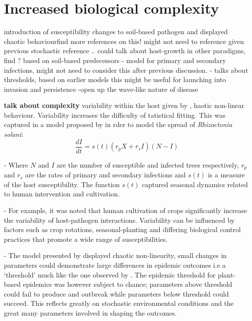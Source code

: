     \section{Increased biological complexity}
    \cite{doi:10.1098/rspb.1996.0116} introduction of susceptibility changes to soil-based pathogen and displayed chaotic behaviour\textemdash find more references on this!
    might not need to reference \cite{doi:10.1098/rspb.1996.0116} given previous stochastic reference \cite{gilligan1985probability}..
    could talk about host-growth in other paradigms, find ? based on soil-based predecessors
    -\cite{doi:10.1098/rstb.1997.0040} model for primary and secondary infections, might not need to consider this after previous discussion.
    -\cite{GUBBINS2000219} talks about thresholds, based on earlier models this might be useful for launching into invasion and persistence 
    -open up the wave-like nature of disease 
    
    \textbf{talk about complexity}
    variability within the host given by \cite{doi:10.1098/rspb.1996.0116}, haotic non-linear behaviour. Variability increases the difficulty of tatistical fitting.
    This was captured in a model proposed by \cite{doi:10.1098/rspb.1996.0116} in rder to model the spread of \textit{Rhizoctonia solani}:
    \begin{equation}
    \label{eq:early-model}
        \frac{dI}{dt} = s(t)(r_pX + r_sI)(N-I)
    \end{equation}
    
    - Where $N$ and $I$ are the number of susceptible and infected trees respectively, $r_p$ and $r_s$ are the rates of primary and secondary infections and $s(t)$ is a measure of the host susceptibility. The function $s(t)$ captured seasonal dynamics related to human intervention and cultivation.
    
    - For example, it was noted that human cultivation of crops significantly increase the variability of host-pathogen interactions. Variability can be influenced by factors such as crop rotations, seasonal-planting and differing biological control practices that promote a wide range of susceptibilities.
    
    - The model presented by \cite{doi:10.1098/rspb.1996.0116} displayed chaotic non-linearity, small changes in parameters could demonstrate large differences in epidemic outcomes i.e a `threshold' much like the one observed by \cite{kermack-model}. The epidemic threshold for plant-based epidemics was however subject to chance; parameters above threshold could fail to produce and outbreak while parameters below threshold could succeed. This reflects greatly on stochastic environmental conditions and the great many parameters involved in shaping the outcomes.
    
